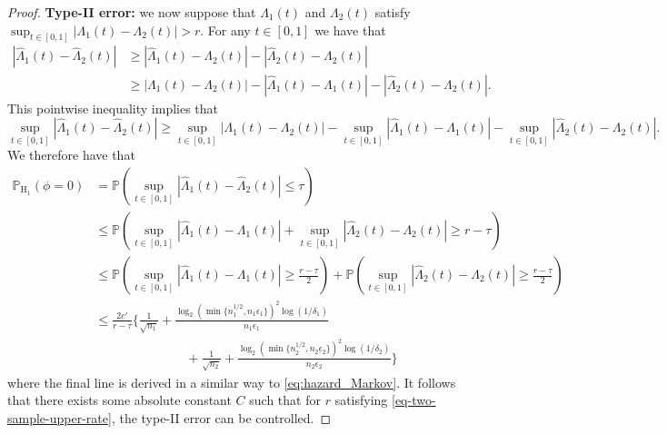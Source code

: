 \documentclass[11pt]{article}
\begin{document}
\begin{proof}
\bigskip
\noindent \textbf{Type-II error:} we now suppose that $\Lambda_1(t)$ and $\Lambda_2(t)$ satisfy $\sup_{t \in [0, 1]} |\Lambda_1(t) - \Lambda_2(t)| > r$. For any $t \in [0, 1]$ we have that
\begin{align*}
    |\widehat{\Lambda}_1(t) - \widehat{\Lambda}_2(t)| &\geq |\widehat{\Lambda}_1(t) - \Lambda_2(t)| - |\widehat{\Lambda}_2(t) - \Lambda_2(t)| \\
    &\geq |\Lambda_1(t) - \Lambda_2(t) | - | \widehat{\Lambda}_1(t) - \Lambda_1(t)|- |\widehat{\Lambda}_2(t) - \Lambda_2(t)|. 
\end{align*}
This pointwise inequality implies that 
\begin{equation*}
    \sup_{t \in [0, 1]} |\widehat{\Lambda}_1(t) - \widehat{\Lambda}_2(t)| \geq \sup_{t \in [0, 1]} |\Lambda_1(t) - \Lambda_2(t)| - \sup_{t \in [0, 1]} | \widehat{\Lambda}_1(t) - \Lambda_1(t)|- \sup_{t \in [0, 1]} |\widehat{\Lambda}_2(t) - \Lambda_2(t)|.
\end{equation*}
We therefore have that 
\begin{align*}
    \mathbb{P}_{\mathrm{H}_1} \left(\phi=0 \right) &= \mathbb{P} \left( \sup_{t \in [0, 1]} |\widehat{\Lambda}_1(t) - \widehat{\Lambda}_2(t)| \leq \tau\right) \\
    &\leq \mathbb{P} \left( \sup_{t \in [0, 1]} |\widehat{\Lambda}_1(t) - \Lambda_1(t)| + \sup_{t \in [0,1]}|\widehat{\Lambda}_2(t) - \Lambda_2(t)| \geq r - \tau \right)\\
    &\leq \mathbb{P} \left( \sup_{t \in [0, 1]} |\widehat{\Lambda}_1(t) - \Lambda_1(t)| \geq \frac{r - \tau}{2} \right) + \mathbb{P} \left( \sup_{t \in [0, 1]} |\widehat{\Lambda}_2(t) - \Lambda_2(t)| \geq \frac{r -\tau}{2} \right) \\
    &\leq \frac{2c'}{r-\tau} \Bigg\{ \frac{1}{\sqrt{n_1}} + \frac{\log_2(\min\{n_1^{1/2}, n_1\epsilon_1\})^2 \log(1/\delta_1)}{n_1 \epsilon_1}  \\
     &\hspace{3cm} +\frac{1}{\sqrt{n_2}}  + \frac{\log_2(\min\{n_2^{1/2}, n_2\epsilon_2\})^2 \log(1/\delta_2)}{n_2 \epsilon_2} \Bigg\}
\end{align*}
where the final line is derived in a similar way to \eqref{eq:hazard_Markov}. It follows that there exists some absolute constant $C$ such that for $r$ satisfying \eqref{eq-two-sample-upper-rate}, the type-II error can be controlled. 
\end{proof}
\end{document}
